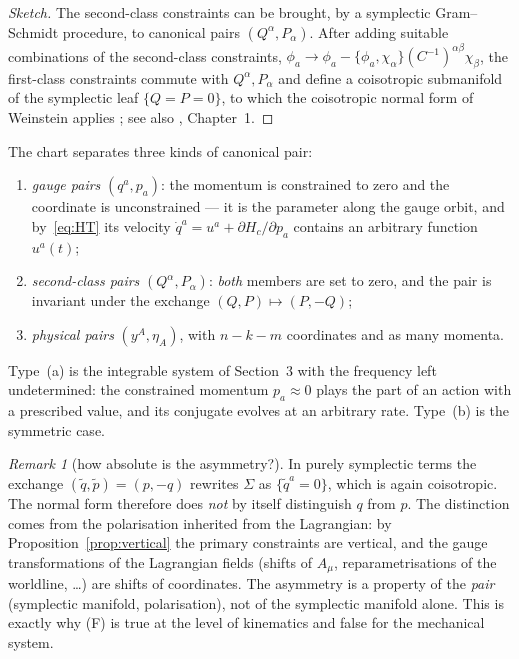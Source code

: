 \documentclass[11pt,a4paper]{article}
\theoremstyle{definition}
\theoremstyle{remark}
\newtheorem{remark}[theorem]{Remark}
\newcommand{\PB}[2]{\{#1,#2\}}
\newcommand{\weq}{\approx}
\begin{document}
\begin{proof}[Sketch]
The second-class constraints can be brought, by a symplectic Gram--Schmidt procedure, to canonical pairs $(Q^\alpha,P_\alpha)$. After adding suitable combinations of the second-class constraints, $\phi_a\to\phi_a-\PB{\phi_a}{\chi_\alpha}(C^{-1})^{\alpha\beta}\chi_\beta$, the first-class constraints commute with $Q^\alpha,P_\alpha$ and define a coisotropic submanifold of the symplectic leaf $\{Q=P=0\}$, to which the coisotropic normal form of Weinstein applies \cite{weinstein,gotay82}; see also \cite{ht}, Chapter~1.
\end{proof}

The chart separates three kinds of canonical pair:
\begin{enumerate}
\item[(a)] \emph{gauge pairs} $(q^a,p_a)$: the momentum is constrained to zero and the coordinate is unconstrained --- it is the parameter along the gauge orbit, and by~\eqref{eq:HT} its velocity $\dot q^a=u^a+\partial H_c/\partial p_a$ contains an arbitrary function $u^a(t)$;
\item[(b)] \emph{second-class pairs} $(Q^\alpha,P_\alpha)$: \emph{both} members are set to zero, and the pair is invariant under the exchange $(Q,P)\mapsto(P,-Q)$;
\item[(c)] \emph{physical pairs} $(y^A,\eta_A)$, with $n-k-m$ coordinates and as many momenta.
\end{enumerate}
Type~(a) is the integrable system of Section~3 with the frequency left undetermined: the constrained momentum $p_a\weq0$ plays the part of an action with a prescribed value, and its conjugate evolves at an arbitrary rate. Type~(b) is the symmetric case.

\begin{remark}[how absolute is the asymmetry?]
In purely symplectic terms the exchange $(\tilde q,\tilde p)=(p,-q)$ rewrites $\Sigma$ as $\{\tilde q^a=0\}$, which is again coisotropic. The normal form therefore does \emph{not} by itself distinguish $q$ from $p$. The distinction comes from the polarisation inherited from the Lagrangian: by Proposition~\ref{prop:vertical} the primary constraints are vertical, and the gauge transformations of the Lagrangian fields (shifts of $A_\mu$, reparametrisations of the worldline, \dots) are shifts of coordinates. The asymmetry is a property of the \emph{pair} (symplectic manifold, polarisation), not of the symplectic manifold alone. This is exactly why (F) is true at the level of kinematics and false for the mechanical system.
\end{remark}
\end{document}
